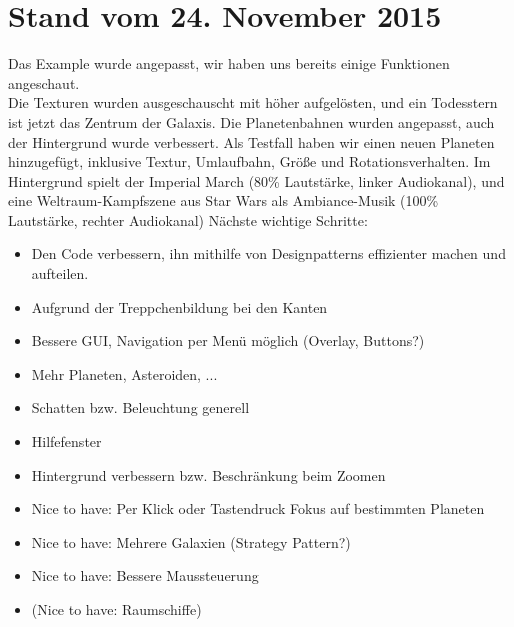 \documentclass[12pt,a4paper,oneside,ngerman]{scrartcl}
\begin{document}
\section{Stand vom 24. November 2015}
Das Example wurde angepasst, wir haben uns bereits einige Funktionen angeschaut. \\
Die Texturen wurden ausgeschauscht mit höher aufgelösten, und ein Todesstern ist jetzt das Zentrum der Galaxis. Die Planetenbahnen wurden angepasst, auch der Hintergrund wurde verbessert. Als Testfall haben wir einen neuen Planeten hinzugefügt, inklusive Textur, Umlaufbahn, Größe und Rotationsverhalten. Im Hintergrund spielt der Imperial March (80\% Lautstärke, linker Audiokanal), und eine Weltraum-Kampfszene aus Star Wars als Ambiance-Musik  (100\% Lautstärke, rechter Audiokanal) \newline \newline
Nächste wichtige Schritte:
\begin{itemize}
\item Den Code verbessern, ihn mithilfe von Designpatterns effizienter machen und aufteilen.
\item Aufgrund der Treppchenbildung bei den Kanten 
\item Bessere GUI, Navigation per Menü möglich (Overlay, Buttons?)
\item Mehr Planeten, Asteroiden, ...
\item Schatten bzw. Beleuchtung generell
\item Hilfefenster 
\item Hintergrund verbessern bzw. Beschränkung beim Zoomen
\item Nice to have: Per Klick oder Tastendruck Fokus auf bestimmten Planeten
\item Nice to have: Mehrere Galaxien (Strategy Pattern?)
\item Nice to have: Bessere Maussteuerung
\item (Nice to have: Raumschiffe)
\end{itemize}

\end{document}
